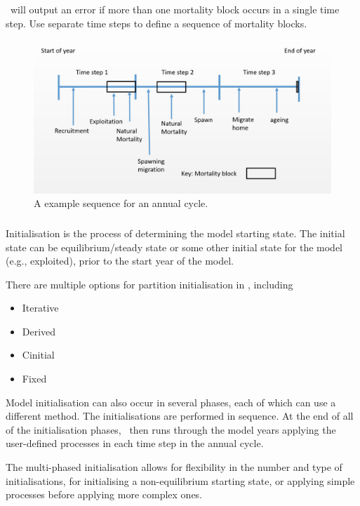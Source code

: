 \CNAME\ will output an error if more than one mortality block occurs in a single time step. Use separate time steps to define a sequence of mortality blocks.

\begin{figure}[H]
	\centering
	\includegraphics[scale=0.5]{Figures/annual_cycle.jpg}
	\caption{A example sequence for an annual cycle.}\label{Fig:annual}
\end{figure}

\subsubsection{}\label{subsec:initialisation}

Initialisation is the process of determining the model starting state. The initial state can be equilibrium/steady state or some other initial state for the model (e.g., exploited), prior to the start year of the model.

There are multiple options for partition initialisation in \CNAME, including

\begin{itemize}
	\item Iterative
	\item Derived
	\item Cinitial
	\item Fixed
\end{itemize}

Model initialisation can also occur in several phases, each of which can use a different method. The initialisations are performed in sequence. At the end of all of the initialisation phases, \CNAME\ then runs through the model years applying the user-defined processes in each time step in the annual cycle.

The multi-phased initialisation allows for flexibility in the number and type of initialisations, for initialising a non-equilibrium starting state, or applying simple processes before applying more complex ones.

